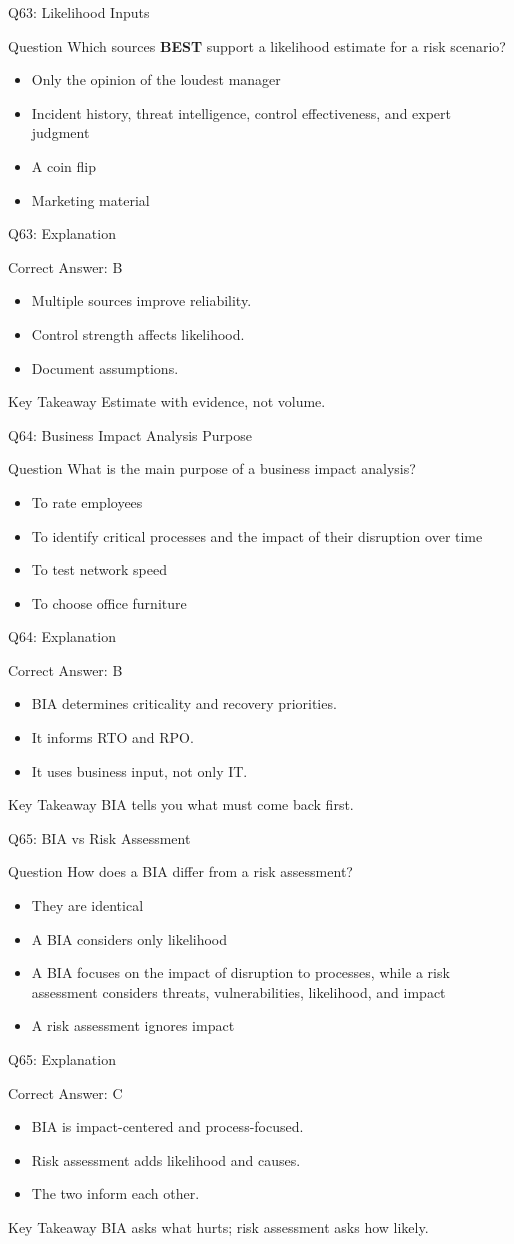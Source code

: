 \documentclass[aspectratio=169]{beamer}
\newcommand{\hq}[7]{%
	\begin{frame}{Q#1: #2}
		\begin{block}{Question}
			#3
		\end{block}
		\begin{itemize}
			#4
		\end{itemize}
	\end{frame}
	\begin{frame}{Q#1: Explanation}
		\begin{block}{Correct Answer: #5}
			\begin{itemize}
				#6
			\end{itemize}
		\end{block}
		\begin{alertblock}{Key Takeaway}
			#7
		\end{alertblock}
	\end{frame}
}
\begin{document}
	\hq{63}{Likelihood Inputs}
	{Which sources \textbf{BEST} support a likelihood estimate for a risk scenario?}
	{\item[\textbf{(A)}] Only the opinion of the loudest manager
		\item[\textbf{(B)}] Incident history, threat intelligence, control effectiveness, and expert judgment
		\item[\textbf{(C)}] A coin flip
		\item[\textbf{(D)}] Marketing material}
	{B}
	{\item Multiple sources improve reliability.
		\item Control strength affects likelihood.
		\item Document assumptions.}
	{Estimate with evidence, not volume.}
	
	\hq{64}{Business Impact Analysis Purpose}
	{What is the main purpose of a business impact analysis?}
	{\item[\textbf{(A)}] To rate employees
		\item[\textbf{(B)}] To identify critical processes and the impact of their disruption over time
		\item[\textbf{(C)}] To test network speed
		\item[\textbf{(D)}] To choose office furniture}
	{B}
	{\item BIA determines criticality and recovery priorities.
		\item It informs RTO and RPO.
		\item It uses business input, not only IT.}
	{BIA tells you what must come back first.}
	
	\hq{65}{BIA vs Risk Assessment}
	{How does a BIA differ from a risk assessment?}
	{\item[\textbf{(A)}] They are identical
		\item[\textbf{(B)}] A BIA considers only likelihood
		\item[\textbf{(C)}] A BIA focuses on the impact of disruption to processes, while a risk assessment considers threats, vulnerabilities, likelihood, and impact
		\item[\textbf{(D)}] A risk assessment ignores impact}
	{C}
	{\item BIA is impact-centered and process-focused.
		\item Risk assessment adds likelihood and causes.
		\item The two inform each other.}
	{BIA asks what hurts; risk assessment asks how likely.}
	
\end{document}
